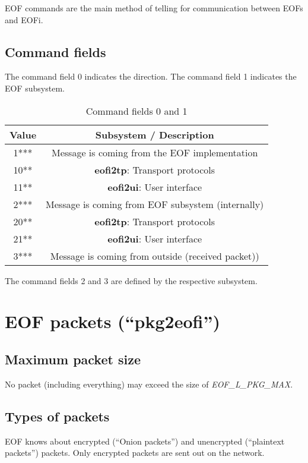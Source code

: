 \documentclass[12pt,a4paper]{book}
\begin{document}
EOF commands are the main method of telling for communication between
EOFs and EOFi.
\subsection{Command fields}
The command field 0 indicates the direction.
The command field 1 indicates the EOF subsystem.
\begin{longtable}{|c|c|}
\caption{Command fields 0 and 1}\\
\hline
\textbf{Value} & \textbf{Subsystem} / \textbf{Description}\\
\hline
1*** & Message is coming from the EOF implementation\\
\hline
10** & \textbf{eofi2tp}: Transport protocols\\
\hline
11** & \textbf{eofi2ui}: User interface\\
\hline
2*** & Message is coming from EOF subsystem (internally)\\
\hline
20** & \textbf{eofi2tp}: Transport protocols\\
\hline
21** & \textbf{eofi2ui}: User interface\\
\hline
3*** & Message is coming from outside (received packet))\\
\hline
\end{longtable}
The command fields 2 and 3 are defined by the respective subsystem.
\section{EOF packets ("`pkg2eofi"')}
\subsection{Maximum packet size}
No packet (including everything) may exceed the size of \emph{EOF\_L\_PKG\_MAX}.
\subsection{Types of packets}
EOF knows about encrypted ("`Onion packets"') and
unencrypted ("`plaintext packets"') packets.
Only encrypted packets are sent out on the network.
\end{document}
